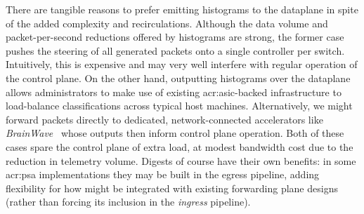 There are tangible reasons to prefer emitting histograms to the dataplane in spite of the added complexity and recirculations.
Although the data volume and packet-per-second reductions offered by \seidr{} histograms are strong, the former case pushes the steering of all generated packets onto a single controller per switch.
Intuitively, this is expensive and may very well interfere with regular operation of the control plane.
On the other hand, outputting histograms over the dataplane allows administrators to make use of existing \gls{acr:asic}-backed infrastructure to load-balance classifications across typical host machines.
Alternatively, we might forward packets directly to dedicated, network-connected accelerators like \emph{BrainWave}~\parencite{DBLP:conf/isca/FowersOPMLLAHAG18} whose outputs then inform control plane operation.
Both of these cases spare the control plane of extra load, at modest bandwidth cost due to the reduction in telemetry volume.
Digests of course have their own benefits: in some \gls{acr:psa} implementations they may be built in the egress pipeline, adding flexibility for how \seidr{} might be integrated with existing forwarding plane designs (rather than forcing its inclusion in the \emph{ingress} pipeline).

%
%


